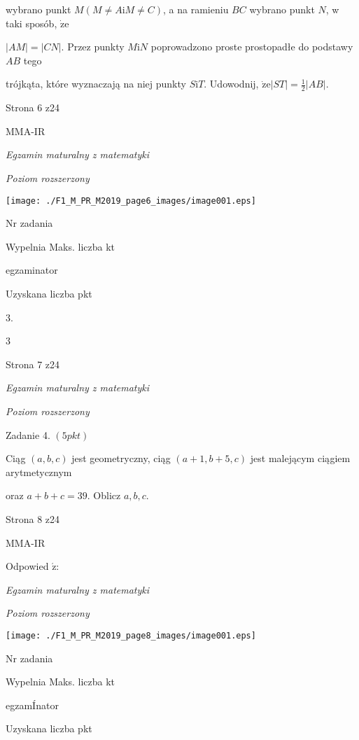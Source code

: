 \documentclass[a4paper,12pt]{article}
\begin{document}
wybrano punkt $M(M\neq A\mathrm{i}M\neq C)$, a na ramieniu $BC$ wybrano punkt $N$, w taki sposób, $\dot{\mathrm{z}}\mathrm{e}$

$|AM|=|CN|$. Przez punkty $M\mathrm{i}N$ poprowadzono proste prostopadłe do podstawy $AB$ tego

trójkąta, które wyznaczają na niej punkty $S\mathrm{i}T$. Udowodnij, $\displaystyle \dot{\mathrm{z}}\mathrm{e}|ST|=\frac{1}{2}|AB|.$

Strona 6 z24

MMA-IR





{\it Egzamin maturalny z matematyki}

{\it Poziom rozszerzony}
\begin{center}
\texttt{[image: ./F1\_M\_PR\_M2019\_page6\_images/image001.eps]}
\end{center}
Nr zadania

Wypelnia Maks. liczba kt

egzaminator

Uzyskana liczba pkt

3.

3

Strona 7 z24





{\it Egzamin maturalny z matematyki}

{\it Poziom rozszerzony}

Zadanie 4. $(5pkt)$

Ciąg $(a,b,c)$ jest geometryczny, ciąg $(a+1,b+5,c)$ jest malejącym ciągiem arytmetycznym

oraz $a+b+c=39$. Oblicz $a, b, c.$

Strona 8 z24

MMA-IR





Odpowied $\acute{\mathrm{z}}$:

{\it Egzamin maturalny z matematyki}

{\it Poziom rozszerzony}
\begin{center}
\texttt{[image: ./F1\_M\_PR\_M2019\_page8\_images/image001.eps]}
\end{center}
Nr zadania

Wypelnia Maks. liczba kt

egzamÍnator

Uzyskana liczba pkt
\end{document}
